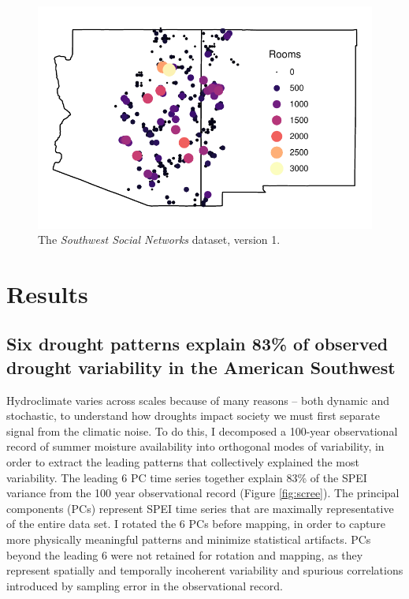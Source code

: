 \documentclass[11pt]{wlscirep}
\begin{document}
\begin{figure}[!ht]
\centering
\includegraphics[width=.9\linewidth]{figures/site_distribution.pdf}
\caption{The \emph{Southwest Social Networks} dataset, version 1.} 
\label{fig:network-plot}
\end{figure}


\section*{Results}

\subsection*{Six drought patterns explain 83\% of observed drought variability in the American Southwest}
Hydroclimate varies across scales because of many reasons -- both dynamic and stochastic, to understand how droughts impact society we must first separate signal from the climatic noise. To do this, I decomposed a 100-year observational record of summer moisture availability into orthogonal modes of variability, in order to extract the leading patterns that collectively explained the most variability. The leading 6 PC time series together explain 83\% of the SPEI variance from the 100 year observational record (Figure \ref{fig:scree}). The principal components (PCs) represent SPEI time series that are maximally representative of the entire data set. I rotated the 6 PCs before mapping, in order to capture more physically meaningful patterns and minimize statistical artifacts. PCs beyond the leading 6 were not retained for rotation and mapping, as they represent spatially and temporally incoherent variability and spurious correlations introduced by sampling error in the observational record. 
\end{document}
